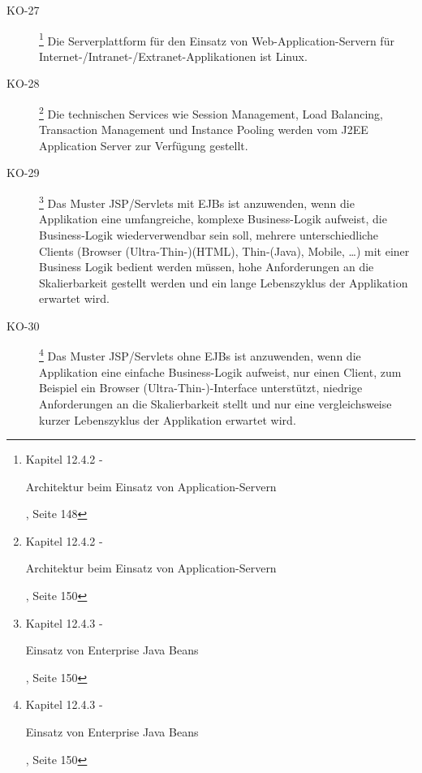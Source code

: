 \documentclass[
11pt, %
a4paper, %
BCOR25mm, %
DIV14, %
footsepline = false, %
headsepline, %
twoside, %
openright,
abstracton, %
listof=totocnumbered, %
bibliography=totocnumbered %
]{scrreprt}
\begin{document}
\begin{description}
    \item[KO-27\label{itm:KO-27}]
    \footnote{\cite{ZkbHandbuchDerItArchitektur} Kapitel 12.4.2 -
    \begin{itshape}Architektur beim Einsatz von
    Application-Servern\end{itshape}, Seite 148}
    Die Serverplattform für den Einsatz von Web-Application-Servern für
    Internet-/Intranet-/Extranet-Applikationen ist Linux.
    
    \item[KO-28\label{itm:KO-28}]
    \footnote{\cite{ZkbHandbuchDerItArchitektur} Kapitel 12.4.2 -
    \begin{itshape}Architektur beim Einsatz von
    Application-Servern\end{itshape}, Seite 150}
    Die technischen Services wie Session Management, Load Balancing,
    Transaction Management und Instance Pooling werden vom J2EE Application
    Server zur Verfügung gestellt.
    
    \item[KO-29\label{itm:KO-29}]
    \footnote{\cite{ZkbHandbuchDerItArchitektur} Kapitel 12.4.3 -
    \begin{itshape}Einsatz von Enterprise Java Beans\end{itshape}, Seite 150}
    Das Muster JSP/Servlets mit EJBs ist anzuwenden, wenn die Applikation eine
    umfangreiche, komplexe Business-Logik aufweist, die Business-Logik
    wiederverwendbar sein soll, mehrere unterschiedliche Clients (Browser
    (Ultra-Thin-)(HTML), Thin-(Java), Mobile, …) mit einer Business Logik
    bedient werden müssen, hohe Anforderungen an die Skalierbarkeit gestellt
    werden und ein lange Lebenszyklus der Applikation erwartet wird.
    
    \item[KO-30\label{itm:KO-30}]
    \footnote{\cite{ZkbHandbuchDerItArchitektur} Kapitel 12.4.3 -
    \begin{itshape}Einsatz von Enterprise Java Beans\end{itshape}, Seite 150}
    Das Muster JSP/Servlets ohne EJBs ist anzuwenden, wenn die Applikation eine
    einfache Business-Logik aufweist, nur einen Client, zum Beispiel ein
    Browser (Ultra-Thin-)-Interface unterstützt, niedrige Anforderungen an die
    Skalierbarkeit stellt und nur eine vergleichsweise kurzer Lebenszyklus der
    Applikation erwartet wird.
    

\end{description}
\end{document}
